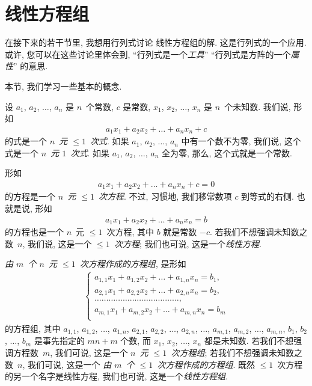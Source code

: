 
\section{线性方程组}

在接下来的若干节里, 我想用行列式讨论%
线性方程组的解.
这是行列式的一个应用.
或许, 您可以在这些讨论里体会到,
``行列式是一个\emph{工具}''
``行列式是方阵的一个\emph{属性}''
的意思.

本节, 我们学习一些基本的概念.

设 \(a_1\), \(a_2\), \(\dots\), \(a_n\) 是 \(n\)~个常数,
\(c\) 是常数,
\(x_1\), \(x_2\), \(\dots\), \(x_n\) 是 \(n\)~个未知数.
我们说, 形如
\begin{align*}
    a_1 x_1 + a_2 x_2 + \dots + a_n x_n + c
\end{align*}
的式是一个 \emph{\(n\)~元 \({\leq} 1\)~次式}.
如果 \(a_1\), \(a_2\), \(\dots\), \(a_n\)
中有一个数不为零,
我们说, 这个式是一个 \emph{\(n\)~元 \(1\)~次式}.
如果 \(a_1\), \(a_2\), \(\dots\), \(a_n\)
全为零,
那么, 这个式就是一个常数.

形如
\begin{align*}
    a_1 x_1 + a_2 x_2 + \dots + a_n x_n + c = 0
\end{align*}
的方程是一个 \emph{\(n\)~元 \({\leq} 1\)~次方程}.
不过, 习惯地, 我们移常数项 \(c\) 到等式的右侧.
也就是说, 形如
\begin{align*}
    a_1 x_1 + a_2 x_2 + \dots + a_n x_n = b
\end{align*}
的方程也是一个 \(n\)~元 \({\leq} 1\)~次方程,
其中 \(b\) 就是常数 \(-c\).
若我们不想强调未知数之数~\(n\),
我们说, 这是一个 \emph{\({\leq} 1\)~次方程};
我们也可说, 这是一个\emph{线性方程}.

\emph{由 \(m\)~个 \(n\)~元 \({\leq} 1\)~次方程作成的方程组},
是形如
\begin{align*}
    \begin{cases}
        a_{1,1} x_1 + a_{1,2} x_2 + \dots + a_{1,n} x_n = b_1, \\
        a_{2,1} x_1 + a_{2,2} x_2 + \dots + a_{2,n} x_n = b_2, \\
        \dots \dots \dots \dots
        \dots \dots \dots \dots
        \dots \dots \dots \dots
        ,                                                      \\
        a_{m,1} x_1 + a_{m,2} x_2 + \dots + a_{m,n} x_n = b_m  \\
    \end{cases}
\end{align*}
的方程组,
其中
\(a_{1,1}\), \(a_{1,2}\), \(\dots\), \(a_{1,n}\),
\(a_{2,1}\), \(a_{2,2}\), \(\dots\), \(a_{2,n}\),
\(\dots\),
\(a_{m,1}\), \(a_{m,2}\), \(\dots\), \(a_{m,n}\),
\(b_1\), \(b_2\), \(\dots\), \(b_m\)
是事先指定的 \(mn + m\) 个数,
而 \(x_1\), \(x_2\), \(\dots\), \(x_n\)
都是未知数.
若我们不想强调方程数~\(m\),
我们可说, 这是一个 \emph{\(n\)~元 \({\leq} 1\)~次方程组};
若我们不想强调未知数之数~\(n\),
我们可说, 这是一个%
\emph{由 \(m\)~个 \({\leq} 1\)~次方程作成的方程组}.
既然 \({\leq} 1\)~次方程的另一个名字是线性方程,
我们也可说, 这是一个\emph{线性方程组}.

